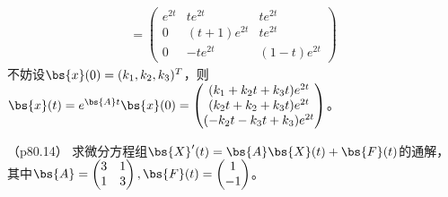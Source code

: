 \documentclass[12pt, a4paper, oneside, UTF8]{ctexbook}
\begin{document}
\begin{solution}
\begin{align*}
    =\begin{pmatrix}
        e^{2t} &te^{2t}&te^{2t} \\
        0 &  (t+1)e^{2t} &te^{2t}\\
        0 & -te^{2t} &(1-t)e^{2t}
    \end{pmatrix}
    \end{align*}
    不妨设$\bs{x}(0)=(k_1,k_2,k_3)^T$，则
    $\bs{x}(t)=e^{\bs{A}t}\bs{x}(0)=\begin{pmatrix}
        (k_1+k_2t+k_3t)e^{2t} \\
        (k_2t+k_2+k_3t)e^{2t}\\
        (-k_2t-k_3t+k_3)e^{2t}
    \end{pmatrix}$。

\end{solution}



\begin{question}（p80.14）
    求微分方程组$\bs{X}'(t)=\bs{A}\bs{X}(t)+\bs{F}(t)$的通解，其中$\bs{A}=\begin{pmatrix}
        3 &1  \\
        1 & 3  \\
    \end{pmatrix},\bs{F}(t)=\begin{pmatrix}
        1 \\
        -1
    \end{pmatrix}$。
\end{question}
\end{document}
